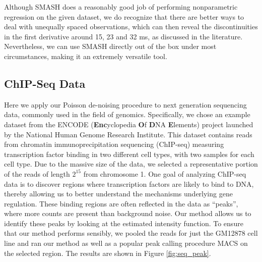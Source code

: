 \documentclass[12pt]{article}
\begin{document}
Although SMASH does a reasonably good job of performing nonparametric regression on the given dataset, we do recognize that there are better ways to deal with unequally spaced observations, which can then reveal the discontinuities in the first derivative around 15, 23 and 32 ms, as discussed in the literature. Nevertheless, we can use SMASH directly out of the box under most circumstances, making it an extremely versatile tool.
\newpage
\subsection{ChIP-Seq Data}
Here we apply our Poisson de-noising procedure to next generation sequencing data, commonly used in the field of genomics. Specifically, we chose an example dataset from the ENCODE (\textbf{Enc}yclopedia \textbf{O}f \textbf{D}NA \textbf{E}lements) project launched by the National Human Genome Research Institute. This dataset contains reads from chromatin immunoprecipitation sequencing (ChIP-seq) measuring transcription factor binding in two different cell types, with two samples for each cell type. Due to the massive size of the data, we selected a representative portion of the reads of length $2^{15}$ from chromosome 1.
One goal of analyzing ChIP-seq data is to discover regions where transcription factors are likely to bind to DNA, thereby allowing us to better understand the mechanisms underlying gene regulation. These binding regions are often reflected in the data as ``peaks'', where more counts are present than background noise. Our method allows us to identify these peaks by looking at the estimated intensity function.
To ensure that our method performs sensibly, we pooled the reads for just the GM12878 cell line and ran our method as well as a popular peak calling procedure MACS on the selected region. The results are shown in Figure \ref{fig:seq_peak}.\\
\end{document}
